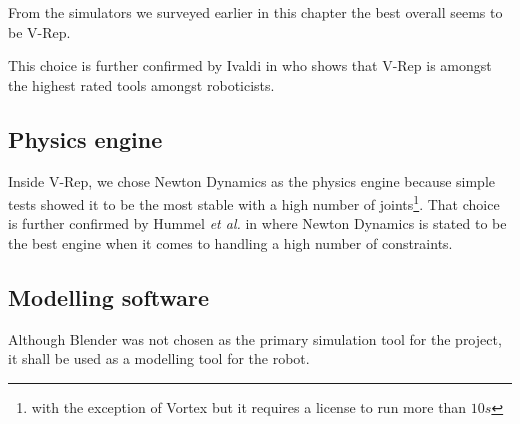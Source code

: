 From the simulators we surveyed earlier in this chapter the best overall seems to be V-Rep.

This choice is further confirmed by Ivaldi in \cite{ivaldi2014tools} who shows that V-Rep is amongst the highest rated tools amongst roboticists.

\subsection{Physics engine}
Inside V-Rep, we chose Newton Dynamics as the physics engine because simple tests showed it to be the most stable with a high number of joints\footnote{with the exception of Vortex but it requires a license to run more than $10s$}. That choice is further confirmed by Hummel \textit{et al.} in \cite{hummel2012evaluation} where Newton Dynamics is stated to be the best engine when it comes to handling a high number of constraints.

\subsection{Modelling software}
Although Blender was not chosen as the primary simulation tool for the project, it shall be used as a modelling tool for the robot. 